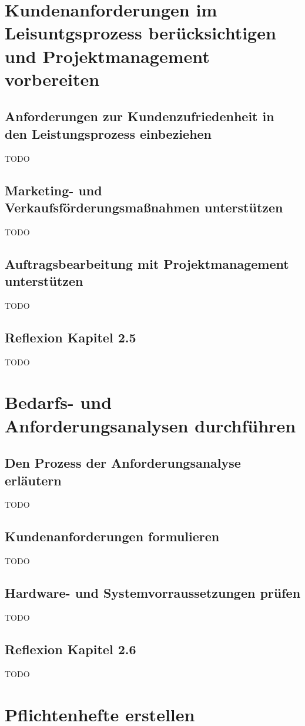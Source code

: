 \documentclass[11pt]{article}
\begin{document}
\newpage
\section{Kundenanforderungen im Leisuntgsprozess berücksichtigen und Projektmanagement vorbereiten}
\subsection{Anforderungen zur Kundenzufriedenheit in den Leistungsprozess einbeziehen}
    TODO
\subsection{Marketing- und Verkaufsförderungsmaßnahmen unterstützen}
    TODO
\subsection{Auftragsbearbeitung mit Projektmanagement unterstützen}
    TODO
\subsection*{Reflexion Kapitel 2.5}
    TODO

\newpage
\section{Bedarfs- und Anforderungsanalysen durchführen}
\subsection{Den Prozess der Anforderungsanalyse erläutern}
    TODO
\subsection{Kundenanforderungen formulieren}
    TODO
\subsection{Hardware- und Systemvorraussetzungen prüfen}
    TODO
\subsection*{Reflexion Kapitel 2.6}
    TODO

\newpage
\section{Pflichtenhefte erstellen}
\end{document}

